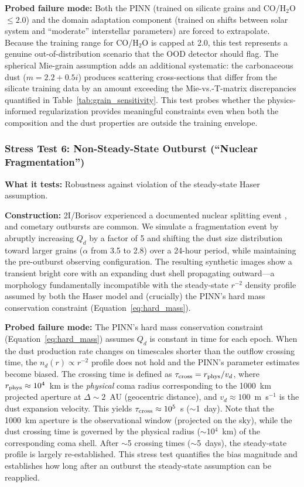 \documentclass[usenatbib]{mnras}
\begin{document}
\textbf{Probed failure mode:} Both the PINN (trained on silicate grains and CO/H$_2$O $\leq 2.0$) and the domain adaptation component (trained on shifts between solar system and ``moderate'' interstellar parameters) are forced to extrapolate. Because the training range for CO/H$_2$O is capped at 2.0, this test represents a genuine out-of-distribution scenario that the OOD detector should flag. The spherical Mie-grain assumption adds an additional systematic: the carbonaceous dust ($m = 2.2 + 0.5i$) produces scattering cross-sections that differ from the silicate training data by an amount exceeding the Mie-vs.-T-matrix discrepancies quantified in Table~\ref{tab:grain_sensitivity}. This test probes whether the physics-informed regularization provides meaningful constraints even when both the composition and the dust properties are outside the training envelope.

\subsubsection{Stress Test 6: Non-Steady-State Outburst (``Nuclear Fragmentation'')}

\textbf{What it tests:} Robustness against violation of the steady-state Haser assumption.

\textbf{Construction:} 2I/Borisov experienced a documented nuclear splitting event \citep{jewitt20}, and cometary outbursts are common. We simulate a fragmentation event by abruptly increasing $Q_d$ by a factor of 5 and shifting the dust size distribution toward larger grains ($\alpha$ from 3.5 to 2.8) over a 24-hour period, while maintaining the pre-outburst observing configuration. The resulting synthetic images show a transient bright core with an expanding dust shell propagating outward---a morphology fundamentally incompatible with the steady-state $r^{-2}$ density profile assumed by both the Haser model and (crucially) the PINN's hard mass conservation constraint (Equation~\ref{eq:hard_mass}).

\textbf{Probed failure mode:} The PINN's hard mass conservation constraint (Equation~\ref{eq:hard_mass}) assumes $Q_d$ is constant in time for each epoch. When the dust production rate changes on timescales shorter than the outflow crossing time, the $n_d(r) \propto r^{-2}$ profile does not hold and the PINN's parameter estimates become biased. The crossing time is defined as $\tau_{\rm cross} = r_{\rm phys} / v_d$, where $r_{\rm phys} \approx 10^4$~km is the \textit{physical} coma radius corresponding to the 1000~km projected aperture at $\Delta\sim2$~AU (geocentric distance), and $v_d\approx100$~m~s$^{-1}$ is the dust expansion velocity. This yields $\tau_{\rm cross} \approx 10^5$~s ($\sim$1~day). Note that the 1000~km aperture is the observational window (projected on the sky), while the dust crossing time is governed by the physical radius ($\sim$10$^4$~km) of the corresponding coma shell. After $\sim$5 crossing times ($\sim$5~days), the steady-state profile is largely re-established. This stress test quantifies the bias magnitude and establishes how long after an outburst the steady-state assumption can be reapplied.
\end{document}
